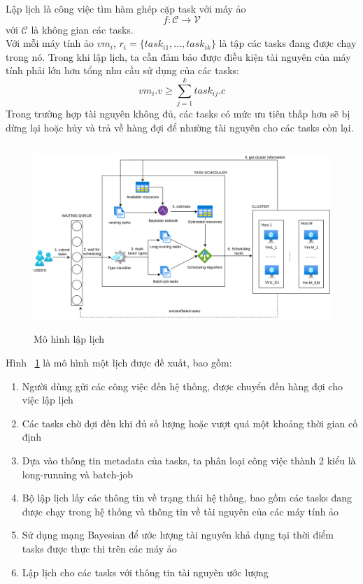 \documentclass{my_style}
\begin{document}
Lập lịch là công việc tìm hàm ghép cặp task với máy ảo 
\begin{equation}
	f: \mathcal{C} \rightarrow \mathcal{V}
\end{equation}
với $\mathcal{C}$ là không gian các tasks.\\
Với mỗi máy tính ảo $vm_{i}$, $r_{i} = \{task_{i1}, ..., task_{ik}\}$ là tập các tasks đang được chạy trong nó. Trong khi lập lịch, ta cần đảm bảo được điều kiện tài nguyên của máy tính phải lớn hơn tổng nhu cầu sử dụng của các tasks: 
\begin{equation}
	vm_{i}.v \geq \sum_{j = 1}^{k}task_{ij}.c
\end{equation}
Trong trường hợp tài nguyên không đủ, các tasks có mức ưu tiên thấp hơn sẽ bị dừng lại hoặc hủy và trả về hàng đợi để nhường tài nguyên cho các tasks còn lại. 
\begin{figure}
	\centering
	\includegraphics[scale=0.5, height=7cm]{images/system_flows.png}
	\caption{Mô hình lập lịch}
	\label{fig:systemflow}
\end{figure}
Hình ~\ref{fig:systemflow} là mô hình một lịch được đề xuất, bao gồm: 
\begin{enumerate}
	\item Người dùng gửi các công việc đến hệ thống, được chuyển đến hàng đợi cho việc lập lịch
	\item Các tasks chờ đợi đến khi đủ số lượng hoặc vượt quá một khoảng thời gian cố định 
	\item Dựa vào thông tin metadata của tasks, ta phân loại công việc thành 2 kiểu là long-running và batch-job
	\item Bộ lập lịch lấy các thông tin về trạng thái hệ thống, bao gồm các tasks đang được chạy trong hệ thống và thông tin về tài nguyên của các máy tính ảo 
	\item Sử dụng mạng Bayesian để ước lượng tài nguyên khả dụng tại thời điểm tasks được thực thi trên các máy ảo 
	\item Lập lịch cho các tasks với thông tin tài nguyên ước lượng
\end{enumerate}
\end{document}
